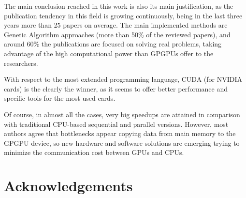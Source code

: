 \documentclass{article}
\begin{document}
The main conclusion reached in this work is also its main justification, as the publication tendency in this field is growing continuously, being in the last three years more than 25 papers on average. The main implemented methods are Genetic Algorithm approaches (more than 50\% of the reviewed papers), and around 60\% the publications are focused on solving real problems, taking advantage of the high computational power than GPGPUs offer to the researchers.

With respect to the most extended programming language, CUDA (for NVIDIA cards) is the clearly the winner, as it seems to offer better performance and specific tools for the most used cards.

Of course, in almost all the cases, very big speedups are attained in comparison with traditional CPU-based sequential and parallel versions. However, most authors agree that bottlenecks appear copying data from main memory to the GPGPU device, so new hardware and software solutions are emerging trying to minimize
the communication cost between GPUs and CPUs.




\section*{Acknowledgements}

\end{document}
